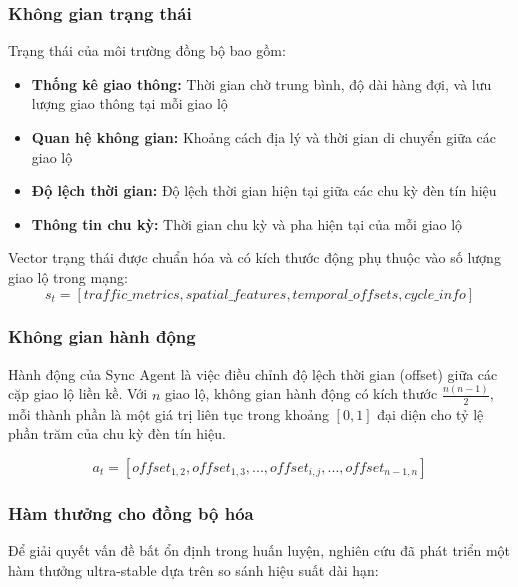 \subsubsection{Không gian trạng thái}
Trạng thái của môi trường đồng bộ bao gồm:
\begin{itemize}
    \item \textbf{Thống kê giao thông:} Thời gian chờ trung bình, độ dài hàng đợi,
        và lưu lượng giao thông tại mỗi giao lộ

    \item \textbf{Quan hệ không gian:} Khoảng cách địa lý và thời gian di
        chuyển giữa các giao lộ

    \item \textbf{Độ lệch thời gian:} Độ lệch thời gian hiện tại giữa các chu kỳ
        đèn tín hiệu

    \item \textbf{Thông tin chu kỳ:} Thời gian chu kỳ và pha hiện tại của mỗi
        giao lộ
\end{itemize}

Vector trạng thái được chuẩn hóa và có kích thước động phụ thuộc vào số lượng giao lộ trong mạng:
\[
    s_{t} = [traffic\_metrics, spatial\_features, temporal\_offsets, cycle\_info]
\]

\subsubsection{Không gian hành động}
Hành động của Sync Agent là việc điều chỉnh độ lệch thời gian (offset) giữa các cặp giao lộ liền kề. Với $n$ giao lộ, không gian hành động có kích thước $\frac{n(n-1)}{2}$, mỗi thành phần là một giá trị liên tục trong khoảng $[0, 1]$ đại diện cho tỷ lệ phần trăm của chu kỳ đèn tín hiệu.

\[
    a_{t} = [offset_{1,2}, offset_{1,3}, ..., offset_{i,j}, ..., offset_{n-1,n}]
\]

\subsubsection{Hàm thưởng cho đồng bộ hóa}
Để giải quyết vấn đề bất ổn định trong huấn luyện, nghiên cứu đã phát triển một hàm thưởng ultra-stable dựa trên so sánh hiệu suất dài hạn:

